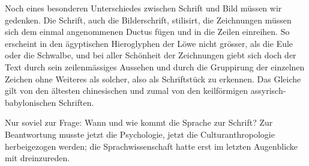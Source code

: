 Noch eines besonderen Unterschiedes zwischen Schrift und Bild müssen \label{sp.129} wir gedenken. Die Schrift, auch die Bilderschrift, stilisirt, die Zeichnungen müssen sich dem einmal angenommenen Ductus fügen und in die Zeilen einreihen. So erscheint in den ägyptischen Hieroglyphen der Löwe nicht grösser, als die Eule oder die Schwalbe, und bei aller Schönheit der Zeichnungen giebt sich doch der Text durch sein zeilenmässiges Aussehen und durch die Gruppirung der einzelnen Zeichen ohne Weiteres als solcher, also als Schriftstück zu erkennen. Das Gleiche gilt von den ältesten chinesischen und zumal von den keilförmigen assyrisch-babylonischen Schriften.

Nur soviel zur Frage: Wann und wie kommt die Sprache zur Schrift? Zur Beantwortung musste jetzt die Psychologie, jetzt die Culturanthropologie herbeigezogen werden; die Sprachwissenschaft hatte erst im letzten Augenblicke mit dreinzureden.

